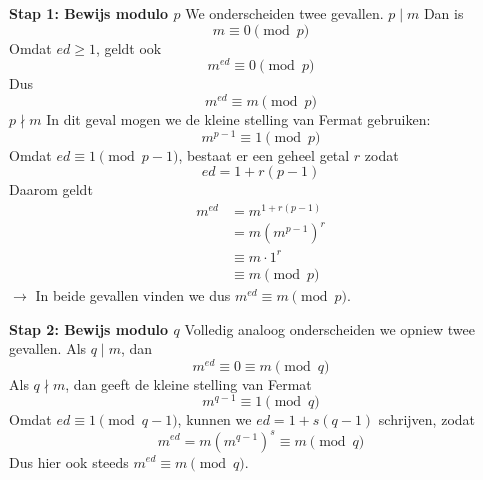 \textbf{Stap 1: Bewijs modulo $p$}\newline
We onderscheiden twee gevallen.\newline
{} $p \mid m$ \newline
Dan is
\begin{equation*}
    m \equiv 0 \pmod p
\end{equation*}
Omdat $ed \ge 1$, geldt ook
\begin{equation*}
    m^{ed} \equiv 0 \pmod p
\end{equation*}
Dus
\begin{equation*}
    m^{ed} \equiv m \pmod p
\end{equation*}
 $p \nmid m$ \newline
In dit geval mogen we de kleine stelling van Fermat gebruiken:
\begin{equation*}
    m^{p-1} \equiv 1 \pmod p
\end{equation*}
Omdat $ed \equiv 1 \pmod {p-1}$, bestaat er een geheel getal $r$ zodat
\begin{equation*}
    ed = 1 + r(p-1)
\end{equation*}
Daarom geldt
\begin{equation*}
    \begin{aligned}
        m^{ed} &= m^{1+r(p-1)} \\
        &= m \left(m^{p-1}\right)^r \\
        &\equiv m \cdot 1^r \\
        &\equiv m \pmod p
    \end{aligned}
\end{equation*}
$\to$ In beide gevallen vinden we dus $m^{ed} \equiv m \pmod p$.

\textbf{Stap 2: Bewijs modulo $q$}\newline
Volledig analoog onderscheiden we opniew twee gevallen. \newline
Als $q \mid m$, dan
\begin{equation*}
    m^{ed} \equiv 0 \equiv m \pmod q
\end{equation*}
Als $q \nmid m$, dan geeft de kleine stelling van Fermat
\begin{equation*}
    m^{q-1} \equiv 1 \pmod q
\end{equation*}
Omdat $ed \equiv 1 \pmod {q-1}$, kunnen we $ed = 1 + s(q-1)$ schrijven, zodat
\begin{equation*}
    m^{ed} = m\left(m^{q-1}\right)^s \equiv m \pmod q
\end{equation*}
Dus hier ook steeds $m^{ed} \equiv m \pmod q$.


